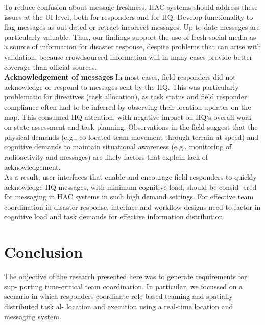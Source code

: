 To reduce confusion about message freshness, HAC systems should address these issues at the UI level, both for responders and for HQ. Develop functionality to flag messages as out-dated or retract incorrect messages. Up-to-date messages are particularly valuable. Thus, our findings support the use of fresh social media as a source of information for disaster response, despite problems that can arise with validation, because crowdsourced information will in many cases provide better coverage than official sources.\\

\textbf{Acknowledgement of messages} In most cases, field responders did not acknowledge or respond to messages sent by the HQ. This was particularly problematic for directives (task allocation), as task status and field responder compliance often had to be inferred by observing their location updates on the map. This consumed HQ attention, with negative impact on HQ`s overall work on state assessment and task planning. Observations in the field suggest that the physical demands (e.g., co-located team movement through terrain at speed) and cognitive demands to maintain situational awareness (e.g., monitoring of radioactivity and messages) are likely factors that explain lack of acknowledgement.\\

As a result, user interfaces that enable and encourage field responders to quickly acknowledge HQ messages, with minimum cognitive load, should be consid- ered for messaging in HAC systems in such high demand settings. For effective team coordination in disaster response, interface and workflow designs need to factor in cognitive load and task demands for effective information distribution.\\


\section{Conclusion}
The objective of the research presented here was to generate requirements for sup- porting time-critical team coordination. In particular, we focussed on a scenario in which responders coordinate role-based teaming and spatially distributed task al- location and execution using a real-time location and messaging system.\\

